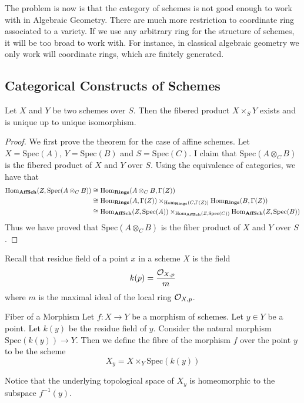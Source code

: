 \documentclass[a4paper]{article}
\begin{document}
The problem is now is that the category of schemes is not good enough to work with in Algebraic Geometry. There are much more restriction to coordinate ring associated to a variety. If we use any arbitrary ring for the structure of schemes, it will be too broad to work with. For instance, in classical algebraic geometry we only work will coordinate rings, which are finitely generated. 

\subsection{Categorical Constructs of Schemes}
\begin{thm}{}{} Let $X$ and $Y$ be two schemes over $S$. Then the fibered product $X\times_SY$ exists and is unique up to unique isomorphism. \tcbline
\begin{proof}
We first prove the theorem for the case of affine schemes. Let $X=\text{Spec}(A)$, $Y=\text{Spec}(B)$ and $S=\text{Spec}(C)$. I claim that $\text{Spec}(A\otimes_CB)$ is the fibered product of $X$ and $Y$ over $S$. Using the equivalence of categories, we have that 
\begin{align*}
\operatorname{Hom}_\bold{AffSch}(Z,\text{Spec}(A\otimes_CB))&\cong\operatorname{Hom}_\bold{Rings}(A\otimes_CB,\Gamma(Z))\\
&\cong\operatorname{Hom}_\bold{Rings}(A,\Gamma(Z))\times_{\operatorname{Hom}_\bold{Rings}(C,\Gamma(Z))}\operatorname{Hom}_\bold{Rings}(B,\Gamma(Z))\\
&\cong\operatorname{Hom}_\bold{AffSch}(Z,\text{Spec}(A))\times_{\operatorname{Hom}_\bold{AffSch}(Z,\text{Spec}(C))}\operatorname{Hom}_\bold{AffSch}(Z,\text{Spec}(B))
\end{align*}
Thus we have proved that $\text{Spec}(A\otimes_CB)$ is the fiber product of $X$ and $Y$ over $S$. 
\end{proof}
\end{thm}

Recall that residue field of a point $x$ in a scheme $X$ is the field $$k(p)=\frac{\mathcal{O}_{X,p}}{m}$$ where $m$ is the maximal ideal of the local ring $\mathcal{O}_{X,p}$. 

\begin{defn}{Fiber of a Morphism}{} Let $f:X\to Y$ be a morphism of schemes. Let $y\in Y$ be a point. Let $k(y)$ be the residue field of $y$. Consider the natural morphism $\text{Spec}(k(y))\to Y$. Then we define the fibre of the morphism $f$ over the point $y$ to be the scheme $$X_y=X\times_Y\text{Spec}(k(y))$$
\end{defn}

Notice that the underlying topological space of $X_y$ is homeomorphic to the subspace $f^{-1}(y)$. 
\end{document}
